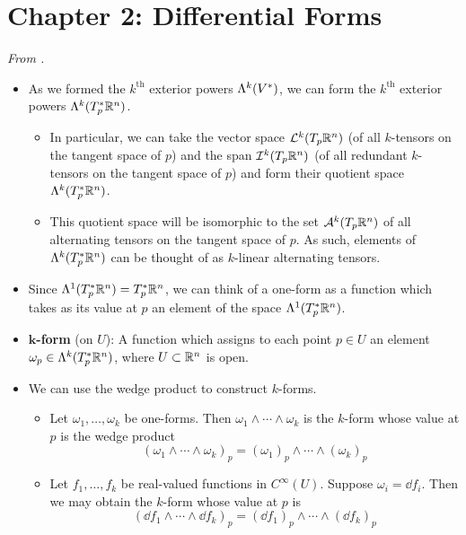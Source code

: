 \documentclass[../notes.tex]{subfiles}
\begin{document}
\section{Chapter 2: Differential Forms}
\emph{From \textcite{bib:DifferentialForms}.}
\begin{itemize}
    \item {}As we formed the $k^\text{th}$ exterior powers $\lam[k]{V^*}$, we can form the $k^\text{th}$ exterior powers $\lam[k]{T_p^*\R^n}$.
    \begin{itemize}
        \item In particular, we can take the vector space $\lin[k]{T_p\R^n}$ (of all $k$-tensors on the tangent space of $p$) and the span $\ide[k]{T_p\R^n}$ (of all redundant $k$-tensors on the tangent space of $p$) and form their quotient space $\lam[k]{T_p^*\R^n}$.
        \item This quotient space will be isomorphic to the set $\alt[k]{T_p\R^n}$ of all alternating tensors on the tangent space of $p$. As such, elements of $\lam[k]{T_p^*\R^n}$ can be thought of as $k$-linear alternating tensors.
    \end{itemize}
    \item Since $\lam[1]{T_p^*\R^n}=T_p^*\R^n$, we can think of a one-form as a function which takes as its value at $p$ an element of the space $\lam[1]{T_p^*\R^n}$.
    \item \textbf{$\bm{k}$-form} (on $U$): A function which assigns to each point $p\in U$ an element $\omega_p\in\lam[k]{T_p^*\R^n}$, where $U\subset\R^n$ is open.
    \item We can use the wedge product to construct $k$-forms.
    \begin{itemize}
        \item Let $\omega_1,\dots,\omega_k$ be one-forms. Then $\omega_1\wedge\cdots\wedge\omega_k$ is the $k$-form whose value at $p$ is the wedge product
        \begin{equation*}
            (\omega_1\wedge\cdots\wedge\omega_k)_p = (\omega_1)_p\wedge\cdots\wedge(\omega_k)_p
        \end{equation*}
        \item Let $f_1,\dots,f_k$ be real-valued functions in $C^\infty(U)$. Suppose $\omega_i=\dd f_i$. Then we may obtain the $k$-form whose value at $p$ is
        \begin{equation*}
            (\dd f_1\wedge\cdots\wedge\dd f_k)_p = (\dd f_1)_p\wedge\cdots\wedge(\dd f_k)_p
        \end{equation*}

\end{itemize}
\end{itemize}
\end{document}
